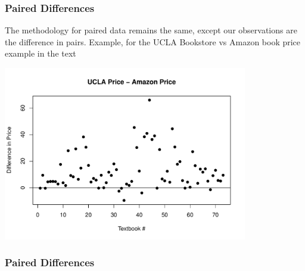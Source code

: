 \documentclass[handout]{beamer}
\newcommand{\blue}[1]{\textcolor{blue2}{#1}}
\newcommand{\xbar}{\overline{x}}
\begin{document}
\begin{frame}[fragile]
\frametitle{Paired Differences}
The methodology for paired data remains the same, except our \blue{observations} are the difference in pairs.  Example, for the UCLA Bookstore vs Amazon book price example in the text
\begin{center}
\includegraphics[width=0.8\textwidth]{figure/diff2.pdf}
\end{center}


\end{frame}


\begin{frame}[fragile]
\frametitle{Paired Differences}


\end{frame}
\end{document}
